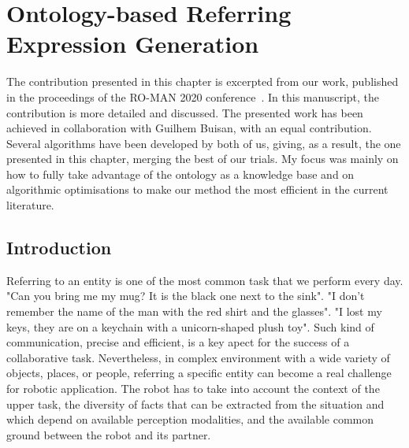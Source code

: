 \ifdefined{}
\else
\setcounter{chapter}{4} %
\dominitoc
\faketableofcontents
\fi

\chapter{Ontology-based Referring Expression Generation}
\label{chap:4}
\minitoc

The contribution presented in this chapter is excerpted from our work, published in the proceedings of the RO-MAN 2020 conference~\cite{buisan_2020_efficient}. In this manuscript, the contribution is more detailed and discussed. The presented work has been achieved in collaboration with Guilhem Buisan, with an equal contribution. Several algorithms have been developed by both of us, giving, as a result, the one presented in this chapter, merging the best of our trials. My focus was mainly on how to fully take advantage of the ontology as a knowledge base and on algorithmic optimisations to make our method the most efficient in the current literature.

\section{Introduction}

Referring to an entity is one of the most common task that we perform every day. "Can you bring me my mug? It is the black one next to the sink". "I don't remember the name of the man with the red shirt and the glasses". "I lost my keys, they are on a keychain with a unicorn-shaped plush toy". Such kind of communication, precise and efficient, is a key apect for the success of a collaborative task. Nevertheless, in complex environment with a wide variety of objects, places, or people, referring a specific entity can become a real challenge for robotic application. The robot has to take into account the context of the upper task, the diversity of facts that can be extracted from the situation and which depend on available perception modalities, and the available common ground between the robot and its partner. 

